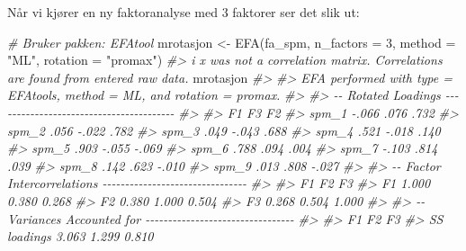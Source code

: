 \documentclass[
]{article}
\newenvironment{Shaded}{\begin{snugshade}}{\end{snugshade}}
\newcommand{\AttributeTok}[1]{\textcolor[rgb]{0.77,0.63,0.00}{#1}}
\newcommand{\CommentTok}[1]{\textcolor[rgb]{0.56,0.35,0.01}{\textit{#1}}}
\newcommand{\DecValTok}[1]{\textcolor[rgb]{0.00,0.00,0.81}{#1}}
\newcommand{\FunctionTok}[1]{\textcolor[rgb]{0.00,0.00,0.00}{#1}}
\newcommand{\NormalTok}[1]{#1}
\newcommand{\OtherTok}[1]{\textcolor[rgb]{0.56,0.35,0.01}{#1}}
\newcommand{\StringTok}[1]{\textcolor[rgb]{0.31,0.60,0.02}{#1}}
\begin{document}
Når vi kjører en ny faktoranalyse med 3 faktorer ser det slik ut:

\begin{Shaded}
\begin{Highlighting}[]
\CommentTok{\# Bruker pakken: EFAtool}
\NormalTok{mrotasjon }\OtherTok{\textless{}{-}} \FunctionTok{EFA}\NormalTok{(fa\_spm, }\AttributeTok{n\_factors =} \DecValTok{3}\NormalTok{, }\AttributeTok{method =} \StringTok{"ML"}\NormalTok{, }\AttributeTok{rotation =} \StringTok{"promax"}\NormalTok{)}
\CommentTok{\#\textgreater{} i \textquotesingle{}x\textquotesingle{} was not a correlation matrix. Correlations are found from entered raw data.}
\NormalTok{mrotasjon}
\CommentTok{\#\textgreater{} }
\CommentTok{\#\textgreater{} EFA performed with type = \textquotesingle{}EFAtools\textquotesingle{}, method = \textquotesingle{}ML\textquotesingle{}, and rotation = \textquotesingle{}promax\textquotesingle{}.}
\CommentTok{\#\textgreater{} }
\CommentTok{\#\textgreater{} {-}{-} Rotated Loadings {-}{-}{-}{-}{-}{-}{-}{-}{-}{-}{-}{-}{-}{-}{-}{-}{-}{-}{-}{-}{-}{-}{-}{-}{-}{-}{-}{-}{-}{-}{-}{-}{-}{-}{-}{-}{-}{-}{-}{-}}
\CommentTok{\#\textgreater{} }
\CommentTok{\#\textgreater{}           F1      F3      F2  }
\CommentTok{\#\textgreater{} spm\_1    {-}.066    .076    .732}
\CommentTok{\#\textgreater{} spm\_2     .056   {-}.022    .782}
\CommentTok{\#\textgreater{} spm\_3     .049   {-}.043    .688}
\CommentTok{\#\textgreater{} spm\_4     .521   {-}.018    .140}
\CommentTok{\#\textgreater{} spm\_5     .903   {-}.055   {-}.069}
\CommentTok{\#\textgreater{} spm\_6     .788    .094    .004}
\CommentTok{\#\textgreater{} spm\_7    {-}.103    .814    .039}
\CommentTok{\#\textgreater{} spm\_8     .142    .623   {-}.010}
\CommentTok{\#\textgreater{} spm\_9     .013    .808   {-}.027}
\CommentTok{\#\textgreater{} }
\CommentTok{\#\textgreater{} {-}{-} Factor Intercorrelations {-}{-}{-}{-}{-}{-}{-}{-}{-}{-}{-}{-}{-}{-}{-}{-}{-}{-}{-}{-}{-}{-}{-}{-}{-}{-}{-}{-}{-}{-}{-}{-}}
\CommentTok{\#\textgreater{} }
\CommentTok{\#\textgreater{}       F1      F2      F3  }
\CommentTok{\#\textgreater{} F1    1.000   0.380   0.268}
\CommentTok{\#\textgreater{} F2    0.380   1.000   0.504}
\CommentTok{\#\textgreater{} F3    0.268   0.504   1.000}
\CommentTok{\#\textgreater{} }
\CommentTok{\#\textgreater{} {-}{-} Variances Accounted for {-}{-}{-}{-}{-}{-}{-}{-}{-}{-}{-}{-}{-}{-}{-}{-}{-}{-}{-}{-}{-}{-}{-}{-}{-}{-}{-}{-}{-}{-}{-}{-}{-}}
\CommentTok{\#\textgreater{} }
\CommentTok{\#\textgreater{}                       F1      F2      F3  }
\CommentTok{\#\textgreater{} SS loadings           3.063   1.299   0.810}

\end{Highlighting}
\end{Shaded}
\end{document}
